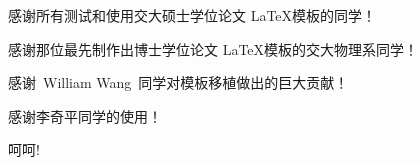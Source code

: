 
\begin{thanks}

  感谢所有测试和使用交大硕士学位论文 \LaTeX 模板的同学！

  感谢那位最先制作出博士学位论文 \LaTeX 模板的交大物理系同学！

  感谢~William Wang~同学对模板移植做出的巨大贡献！

  感谢李奇平同学的使用！

  呵呵!

\end{thanks}
